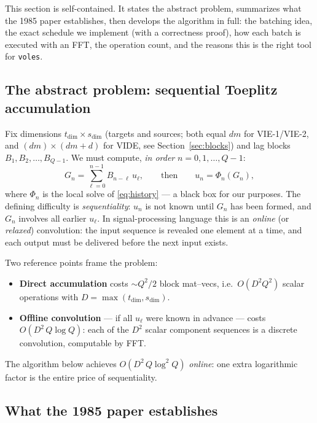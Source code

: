 \documentclass[11pt]{article}
\newcommand{\voles}{\texttt{voles}}
\begin{document}
This section is self-contained. It states the abstract problem,
summarizes what the 1985 paper \cite{hls1985} establishes, then develops
the algorithm in full: the batching idea, the exact schedule we
implement (with a correctness proof), how each batch is executed with an
FFT, the operation count, and the reasons this is the right tool for
\voles.

\subsection{The abstract problem: sequential Toeplitz accumulation}
\label{sec:abstract}

Fix dimensions $t_{\dim}\times s_{\dim}$ (targets and sources; both
equal $dm$ for VIE-1/VIE-2, and $(dm)\times(dm+d)$ for VIDE, see
Section~\ref{sec:blocks}) and lag blocks
$B_1, B_2, \dots, B_{Q-1}$. We must compute, \emph{in order}
$n = 0, 1, \dots, Q-1$:
\begin{equation}
G_n = \sum_{\ell=0}^{n-1} B_{n-\ell}\,u_\ell,
\qquad\text{then}\qquad
u_n = \Phi_n(G_n),
\label{eq:online}
\end{equation}
where $\Phi_n$ is the local solve of \eqref{eq:history} --- a black box
for our purposes. The defining difficulty is \emph{sequentiality}:
$u_n$ is not known until $G_n$ has been formed, and $G_n$ involves all
earlier $u_\ell$. In signal-processing language this is an
\emph{online} (or \emph{relaxed}) convolution: the input sequence is
revealed one element at a time, and each output must be delivered
before the next input exists.

Two reference points frame the problem:
\begin{itemize}
\item \textbf{Direct accumulation} costs $\sim Q^2/2$ block
  mat--vecs, i.e.\ $O(D^2Q^2)$ scalar operations with
  $D=\max(t_{\dim},s_{\dim})$.
\item \textbf{Offline convolution} --- if all $u_\ell$ were known in
  advance --- costs $O(D^2\,Q\log Q)$: each of the $D^2$ scalar
  component sequences is a discrete convolution, computable by FFT.
\end{itemize}
The algorithm below achieves $O(D^2\,Q\log^2 Q)$ \emph{online}: one
extra logarithmic factor is the entire price of sequentiality.

\subsection{What the 1985 paper establishes}
\label{sec:hls-summary}
\end{document}
